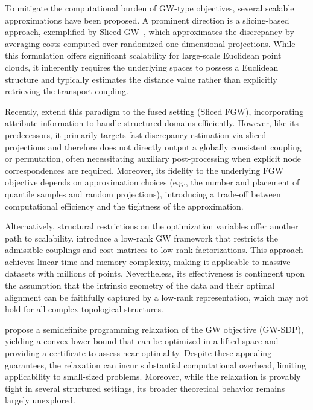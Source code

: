 \documentclass{article}
\theoremstyle{plain}
\theoremstyle{definition}
\theoremstyle{remark}
\begin{document}
To mitigate the computational burden of GW-type objectives, several scalable approximations have been proposed. A prominent direction is a slicing-based approach, exemplified by Sliced GW~\citep{titouan2019sliced}, which approximates the discrepancy by averaging costs computed over randomized one-dimensional projections. While this formulation offers significant scalability for large-scale Euclidean point clouds, it inherently requires the underlying spaces to possess a Euclidean structure and typically estimates the distance value rather than explicitly retrieving the transport coupling. 

Recently, \citet{piening2025novel} extend this paradigm to the fused setting (Sliced FGW), incorporating attribute information to handle structured domains efficiently. However, like its predecessors, it primarily targets fast discrepancy estimation via sliced projections and therefore does not directly output a globally consistent coupling or permutation, often necessitating auxiliary post-processing when explicit node correspondences are required. Moreover, its fidelity to the underlying FGW objective depends on approximation choices (e.g., the number and placement of quantile samples and random projections), introducing a trade-off between computational efficiency and the tightness of the approximation. 

Alternatively, structural restrictions on the optimization variables offer another path to scalability. \citet{scetbon2022linear} introduce a low-rank GW framework that restricts the admissible couplings and cost matrices to low-rank factorizations. This approach achieves linear time and memory complexity, making it applicable to massive datasets with millions of points. Nevertheless, its effectiveness is contingent upon the assumption that the intrinsic geometry of the data and their optimal alignment can be faithfully captured by a low-rank representation, which may not hold for all complex topological structures.

\citet{chen2024semidefinite} propose a semidefinite programming relaxation of the GW objective (GW-SDP), yielding a convex lower bound that can be optimized in a lifted space and providing a certificate to assess near-optimality. Despite these appealing guarantees, the relaxation can incur substantial computational overhead, limiting applicability to small-sized problems. Moreover, while the relaxation is provably tight in several structured settings, its broader theoretical behavior remains largely unexplored.
\end{document}
